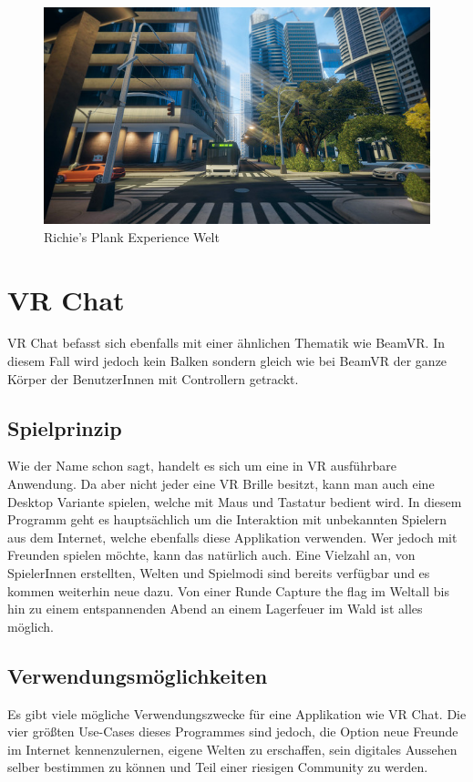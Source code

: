 \begin {figure}
    \includegraphics[scale=0.7]{pics/richiesplankexperience_world}
    \caption{Richie's Plank Experience Welt}
    \label{fig:richiesplankexperience_world}
\end {figure}


\section{VR Chat}
\label{sec:vrchat}
VR Chat befasst sich ebenfalls mit einer \"ahnlichen Thematik wie BeamVR.
In diesem Fall wird jedoch kein Balken sondern gleich wie bei BeamVR der ganze K\"orper der BenutzerInnen mit Controllern getrackt.

\subsection{Spielprinzip}
\label{sec:vrchat_principle}
Wie der Name schon sagt, handelt es sich um eine in VR ausf\"uhrbare Anwendung.
Da aber nicht jeder eine VR Brille besitzt, kann man auch eine Desktop Variante spielen, welche mit Maus und Tastatur bedient wird.
In diesem Programm geht es haupts\"achlich um die Interaktion mit unbekannten Spielern aus dem Internet,
welche ebenfalls diese Applikation verwenden.
Wer jedoch mit Freunden spielen möchte, kann das nat\"urlich auch.
Eine Vielzahl an, von SpielerInnen erstellten, Welten und Spielmodi sind bereits verfügbar und es kommen weiterhin neue dazu.
Von einer Runde Capture the flag im Weltall bis hin zu einem entspannenden Abend an einem Lagerfeuer im Wald ist alles möglich.
~\cite{VRChat_2021_Steam}

\subsection{Verwendungsm\"oglichkeiten}
\label{sec:vrchat_usecases}
Es gibt viele m\"ogliche Verwendungszwecke für eine Applikation wie VR Chat.
Die vier gr\"oßten Use-Cases dieses Programmes sind jedoch, die Option neue Freunde im Internet kennenzulernen, eigene Welten zu erschaffen,
sein digitales Aussehen selber bestimmen zu k\"onnen und Teil einer riesigen Community zu werden.
~\cite{VRChat_2021}

